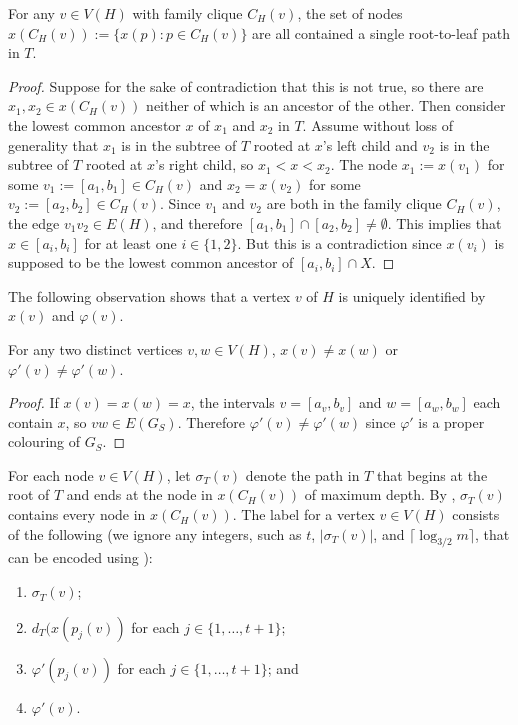 \documentclass[kpfonts]{patmorin}
\begin{document}
\begin{lem}
  For any $v\in V(H)$ with family clique $C_H(v)$, the set of nodes $x(C_H(v)):=\{x(p):p\in C_H(v)\}$ are all contained a single root-to-leaf path in $T$.
\end{lem}

\begin{proof}
  Suppose for the sake of contradiction that this is not true, so there are $x_1,x_2\in x(C_H(v))$ neither of which is an ancestor of the other.  Then consider the lowest common ancestor $x$ of $x_1$ and $x_2$ in $T$.  Assume without loss of generality that $x_1$ is in the subtree of $T$ rooted at $x$'s left child and $v_2$ is in the subtree of $T$ rooted at $x$'s right child, so $x_1<x<x_2$. The node $x_1:=x(v_1)$ for some $v_1:=[a_1,b_1]\in C_H(v)$ and $x_2=x(v_2)$ for some $v_2:=[a_2,b_2]\in C_H(v)$.  Since $v_1$ and $v_2$ are both in the family clique $C_H(v)$, the edge $v_1v_2\in E(H)$, and therefore $[a_1,b_1]\cap[a_2,b_2]\neq\emptyset$.  This implies that $x\in [a_i,b_i]$ for at least one $i\in\{1,2\}$.  But this is a contradiction since $x(v_i)$ is supposed to be the lowest common ancestor of $[a_i,b_i]\cap X$.
\end{proof}

The following observation shows that a vertex $v$ of $H$ is uniquely identified by $x(v)$ and $\varphi(v)$.

\begin{obs}
    For any two distinct vertices $v,w\in V(H)$, $x(v)\neq x(w)$ or $\varphi'(v)\neq\varphi'(w)$.
\end{obs}

\begin{proof}
  If $x(v)=x(w)=x$, the intervals $v=[a_v,b_v]$ and $w=[a_w,b_w]$ each contain $x$, so $vw\in E(G_S)$.  Therefore $\varphi'(v)\neq\varphi'(w)$ since $\varphi'$ is a proper colouring of $G_S$.
\end{proof}

For each node $v\in V(H)$, let $\sigma_T(v)$ denote the path in $T$ that begins at the root of $T$ and ends at the node in $x(C_H(v))$ of maximum depth.  By , $\sigma_T(v)$ contains every node in $x(C_H(v))$.
The label for a vertex $v\in V(H)$ consists of the following (we ignore any integers, such as $t$, $|\sigma_T(v)|$, and $\lceil\log_{3/2} m\rceil$, that can be encoded using ):

\begin{enumerate}[(TC1)]
  \item $\sigma_T(v)$;
  \item $d_T(x(p_j(v))$ for each $j\in\{1,\ldots,t+1\}$; 
  \item $\varphi'(p_j(v))$ for each $j\in\{1,\ldots,t+1\}$; and
  \item $\varphi'(v)$.
\end{enumerate}
\end{document}
